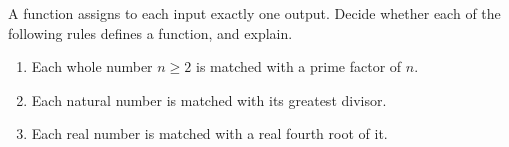 A function assigns to each input exactly one output. Decide whether each of the following rules defines a function, and explain.
\begin{enumerate}
\item[(a)] Each whole number $n\ge2$ is matched with a prime factor of $n$.
\item[(b)] Each natural number is matched with its greatest divisor.
\item[(c)] Each real number is matched with a real fourth root of it.
\end{enumerate}
